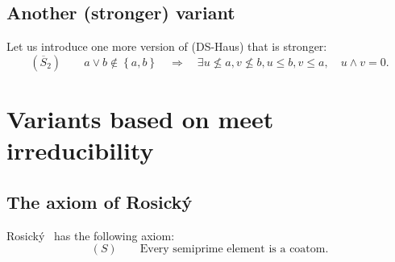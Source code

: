 \subsection{Another (stronger) variant}
Let us introduce one more version of (DS-Haus) that is stronger:
\[
  (\overline{S}_2) \qquad
  a \vee b \not\in \left\{a, b\right\} \quad \Rightarrow \quad \exists
  u\not\leq a, v\not\leq b, \boxed{u \le b, v \le a}, \quad u \wedge v = 0.
\]

\section{Variants based on meet irreducibility}

\subsection{The axiom of Rosický}
Rosický~\cite{rosicky-smarda85} has the following axiom:
\[
  (S) \qquad
  \text{Every semiprime element is a~coatom.}
\]
